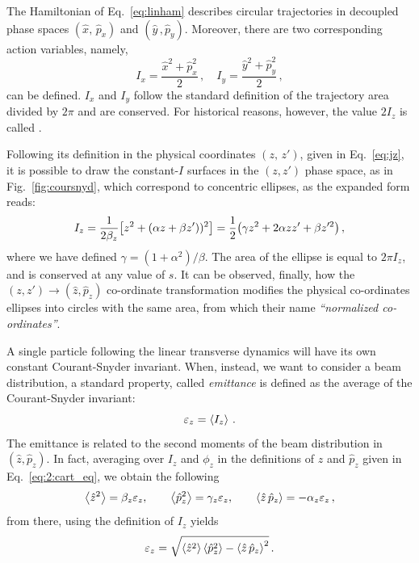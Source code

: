 The Hamiltonian of Eq.~\eqref{eq:linham} describes circular trajectories in decoupled phase spaces $(\hat x,\,\hat p_x)$ and $(\hat y\,, \hat p_y)$. Moreover, there are two corresponding action variables, namely,
\begin{equation}
    I_x = \frac{\hat x^2 +\hat p_x^2}{2}\,, \quad I_y=\frac{\hat y^2+\hat p_y^2}{2} \,,
\end{equation}
can be defined. $I_x$ and $I_y$ follow the standard definition of the trajectory area divided by $2\pi$ and are conserved. For historical reasons, however, the value $2I_z$ is called .

Following its definition in the physical coordinates $(z,\, z')$, given in Eq.~\eqref{eq:jz}, it is possible to draw the constant-$I$ surfaces in the $(z,z')$ phase space, as in Fig.~\ref{fig:coursnyd}, which correspond to concentric ellipses, as the expanded form reads:
%
\begin{equation}
I_z = \frac{1}{2\beta_z}\qty[z^2 + (\alpha z + \beta z'))^2] = \frac{1}{2}\qty(\gamma z^2 + 2\alpha z z' + \beta z'^2)\,, \end{equation}
%
where we have defined $\gamma=(1+\alpha^2)/\beta$. The area of the ellipse is equal to $2\pi I_z$, and is conserved at any value of $s$. It can be observed, finally, how the $(z,z')\to(\hat z,\hat p_z)$ co-ordinate transformation modifies the physical co-ordinates ellipses into circles with the same area, from which their name \textit{``normalized co-ordinates''}.

A single particle following the linear transverse dynamics will have its own constant Courant-Snyder invariant. When, instead, we want to consider a beam distribution, a standard property, called \textit{emittance} is defined as the average of the Courant-Snyder invariant:
\begin{equation}
    \varepsilon_z = \left<{I_z}\right> \,.
\end{equation}
The emittance is related to the second moments of the beam distribution in $(\hat z,\hat p_z)$. In fact, averaging over $I_z$ and $\phi_z$ in the definitions of $\hat z$ and $\hat p_z$ given in Eq.~\eqref{eq:2:cart_eq}, we obtain the following
%
\begin{equation}
	\left<{\hat z^2}\right> = \beta_z \varepsilon_z, \qquad \left<{\hat p_z^2}\right>=\gamma_z \varepsilon_z, \qquad \left<{\hat z\,\hat p_z}\right>=-\alpha_z\varepsilon_z\,,
\end{equation}
%
from there, using the definition of $I_z$ yields
\begin{equation}
	\varepsilon_z = \sqrt{ \left<{\hat z^2}\right>\left<{\hat p_z^2}\right> - \left<{\hat z \, \hat p_z}\right>^2 }\,.
\end{equation}

